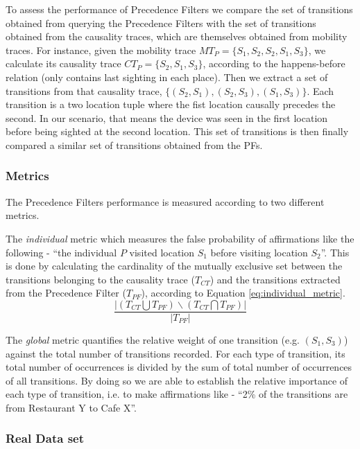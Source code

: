 To assess the performance of Precedence Filters we compare the set of
transitions obtained from querying the Precedence Filters with the set
of transitions obtained from the causality traces, which are themselves
obtained from mobility traces.  For instance, given the mobility trace
$MT_P=\{S_1,S_2,S_2,S_1,S_3\}$, we calculate its causality trace
$CT_P=\{S_2,S_1,S_3\}$, according to the happens-before relation (only
contains last sighting in each place). Then we extract a set of
transitions from that causality trace,
$\{(S_2,S_1),(S_2,S_3),(S_1,S_3)\}$. Each transition is a two location
tuple where the fist location causally precedes the second. In our
scenario, that means the device was seen in the first location
before being sighted at the second location. This
set of transitions is then finally compared a similar set of
transitions obtained from the PFs.


\subsubsection{Metrics}

The Precedence Filters performance is measured according to two
different metrics.

The \emph{individual} metric which measures the
false probability of affirmations like the following - ``the
individual $P$ visited location $S_1$ before visiting location
$S_2$''. This is done by calculating the cardinality of the mutually
exclusive set between the transitions belonging to the causality trace
($T_{CT}$) and the transitions extracted from the Precedence Filter
($T_{PF}$), according to Equation \ref{eq:individual_metric}.
 \begin{equation}
   \label{eq:individual_metric}
   \frac{ | (T_{CT} \bigcup T_{PF}) \backslash (T_{CT} \bigcap T_{PF}) | }{|T_{PF}|}
 \end{equation}

 The \emph{global} metric quantifies the relative weight of
 one transition (e.g. $(S_1,S_3)$) against the total number of
 transitions recorded. For each type of transition, its total number
 of occurrences is divided by the sum of total number of occurrences
 of all transitions. By doing so we are able to establish the relative
 importance of each type of transition, i.e. to make affirmations like
 - ``2\% of the transitions are from Restaurant Y to Cafe X''.

\subsubsection{Real Data set}

